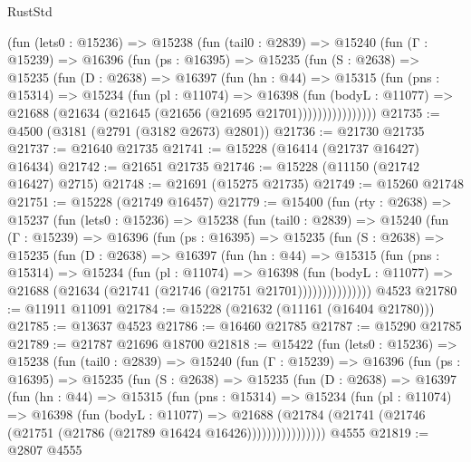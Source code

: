 \begin{lexlean}{RustStd}
\begin{coremodule}
        (fun (lets0 : @15236) =>
        @15238
          (fun (tail0 : @2839) =>
          @15240
            (fun (Γ : @15239) =>
            @16396
              (fun (ps : @16395) =>
              @15235
                (fun (S : @2638) =>
                @15235
                  (fun (D : @2638) =>
                  @16397
                    (fun (hn : @44) =>
                    @15315
                      (fun (pns : @15314) =>
                      @15234
                        (fun (pl : @11074) =>
                        @16398
                          (fun (bodyL : @11077) =>
                          @21688 (@21634 (@21645 (@21656 (@21695 @21701))))))))))))))))
@21735 := @4500 (@3181 (@2791 (@3182 @2673) @2801))
@21736 := @21730 @21735
@21737 := @21640 @21735
@21741 := @15228 (@16414 (@21737 @16427) @16434)
@21742 := @21651 @21735
@21746 := @15228 (@11150 (@21742 @16427) @2715)
@21748 := @21691 (@15275 @21735)
@21749 := @15260 @21748
@21751 := @15228 (@21749 @16457)
@21779 := @15400
    (fun (rty : @2638) =>
    @15237
      (fun (lets0 : @15236) =>
      @15238
        (fun (tail0 : @2839) =>
        @15240
          (fun (Γ : @15239) =>
          @16396
            (fun (ps : @16395) =>
            @15235
              (fun (S : @2638) =>
              @15235
                (fun (D : @2638) =>
                @16397
                  (fun (hn : @44) =>
                  @15315
                    (fun (pns : @15314) =>
                    @15234
                      (fun (pl : @11074) =>
                      @16398
                        (fun (bodyL : @11077) =>
                        @21688 (@21634 (@21741 (@21746 (@21751 @21701)))))))))))))))
    @4523
@21780 := @11911 @11091
@21784 := @15228 (@21632 (@11161 (@16404 @21780)))
@21785 := @13637 @4523
@21786 := @16460 @21785
@21787 := @15290 @21785
@21789 := @21787 @21696 @18700
@21818 := @15422
    (fun (lets0 : @15236) =>
    @15238
      (fun (tail0 : @2839) =>
      @15240
        (fun (Γ : @15239) =>
        @16396
          (fun (ps : @16395) =>
          @15235
            (fun (S : @2638) =>
            @15235
              (fun (D : @2638) =>
              @16397
                (fun (hn : @44) =>
                @15315
                  (fun (pns : @15314) =>
                  @15234
                    (fun (pl : @11074) =>
                    @16398
                      (fun (bodyL : @11077) =>
                      @21688
                        (@21784
                          (@21741 (@21746 (@21751 (@21786 (@21789 @16424 @16426))))))))))))))))
    @4555
@21819 := @2807 @4555

\end{coremodule}
\end{lexlean}
